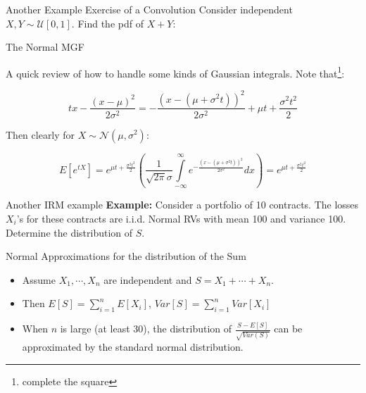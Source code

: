 \documentclass[11pt]{beamer}
\begin{document}
\begin{frame}{Another Example Exercise of a Convolution } 
\vspace{-3 cm}
Consider independent $X,Y \sim \mathcal{U}[0,1]$. Find the pdf of $X+Y$: 

\end{frame}
\begin{frame}

\end{frame}
\begin{frame}{The Normal MGF}
  
A quick review of how to handle some kinds of Gaussian integrals. Note that\footnote{complete the square}:

$$ tx- \frac{(x-\mu)^2}{2\sigma^2} = -\frac{(x-(\mu + \sigma^2 t))^2}{2\sigma^2} + \mu t + \frac{\sigma^2 t^2}{2} $$
  
  \vfill
  
Then clearly for $X \sim \mathcal{N}(\mu,\sigma^2)$:

$$ E[ e^{tX} ] = e^{\mu t + \frac{\sigma^2 t^2}{2}} \left(\frac{1}{\sqrt{2\pi} \sigma}\int\limits_{-\infty}^{\infty} e^{ -\frac{(x-(\mu + \sigma^2 t))^2}{2\sigma^2}} dx\right) =  e^{\mu t + \frac{\sigma^2 t^2}{2}}$$  
  
\end{frame}
\begin{frame}{Another IRM example}
\vspace{- 3 cm}
\textbf{Example:} Consider a portfolio of 10 contracts. The losses $X_i$'s for these contracts are i.i.d. Normal RVs with mean 100 and variance 100.  Determine the distribution of $S$.

\end{frame}
\begin{frame}
  
  
\end{frame}
\begin{frame}{Normal Approximations for the distribution of the Sum}

   \begin{itemize}
   \item Assume $X_1,\cdots,X_n$ are independent and $S=X_1+\cdots+X_n.$

\vfill

   \item Then $E[S]=\sum_{i=1}^n E[X_i]$,  $Var[S]=\sum_{i=1}^n Var[X_i]$

\vfill 

   \item When $n$ is large (at least 30), the distribution of $\frac{S-E[S]}{\sqrt{Var(S)}}$ can be approximated by the standard normal distribution.
   \end{itemize}
  
\end{frame}
\end{document}
